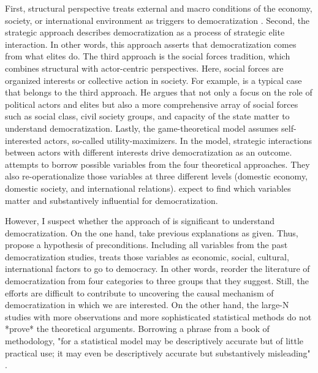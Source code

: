 \documentclass[11pt]{article}
\begin{document}
First, structural perspective treats external and macro conditions of the economy, society, or international environment as triggers to democratization \citep{Pop-Eleches2015}. Second, the strategic approach describes democratization as a process of strategic elite interaction. In other words, this approach asserts that democratization comes from what elites do. The third approach is the social forces tradition, which combines structural with actor-centric perspectives. Here, social forces are organized interests or collective action in society. For example, \citet{Gill2000} is a typical case that belongs to the third approach. He argues that not only a focus on the role of political actors and elites but also a more comprehensive array of social forces such as social class, civil society groups, and capacity of the state matter to understand democratization. Lastly, the game-theoretical model assumes self-interested actors, so-called utility-maximizers. In the model, strategic interactions between actors with different interests drive democratization as an outcome. \citet{Bergschlosser2007ch2} attempts to borrow possible variables from the four theoretical approaches. They also re-operationalize those variables at three different levels (domestic economy, domestic society, and international relations). \citet{Bergschlosser2007ch2} expect to find which variables matter and substantively influential for democratization. 

However, I suspect whether the approach of \citet{Bergschlosser2007ch2} is significant to understand democratization. On the one hand, \citet{Bergschlosser2007ch2} take previous explanations as given. Thus, \citet{Bergschlosser2007ch2} propose a hypothesis of preconditions. Including all variables from the past democratization studies, \citet{Bergschlosser2007ch2} treats those variables as economic, social, cultural, international factors to go to democracy. In other words, \citet{Bergschlosser2007ch2} reorder the literature of democratization from four categories to three groups that they suggest. Still, the efforts are difficult to contribute to uncovering the causal mechanism of democratization in which we are interested. On the other hand, the large-N studies with more observations and more sophisticated statistical methods do not *prove* the theoretical arguments. Borrowing a phrase from a book of methodology, "for a statistical model may be descriptively accurate but of little practical use; it may even be descriptively accurate but substantively misleading" \citep[4]{Fox2016}.  
\end{document}
